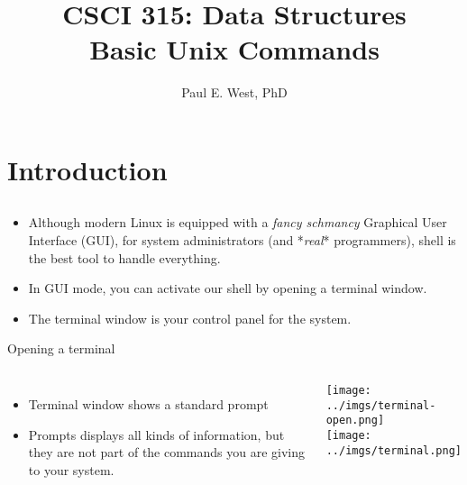 \documentclass{beamer}
\title{CSCI 315: Data Structures \\ 
    Basic Unix Commands
}
\author{Paul E. West, PhD}
\institute{
  Department of Computer Science\\
  Charleston Southern University
}
\begin{document}
\begin{frame}
  \titlepage
\end{frame}


\section{Introduction}
\subsection{}
\begin{frame}{}
\begin{itemize}
\item Although modern Linux is equipped with a \textit{fancy schmancy} Graphical User Interface (GUI), for system administrators (and *\textit{real}* programmers), shell is the best tool to handle everything.
\item In GUI mode, you can activate our shell by opening a terminal window.
\item The terminal window is your control panel for the system.
\end{itemize}
\end{frame}

\begin{frame}{Opening a terminal}
\begin{columns}[c]
\begin{itemize}
\item Terminal window shows a standard prompt
\item Prompts displays all kinds of information, but they are not part of the commands you are giving to your system.
\end{itemize}
\texttt{[image: ../imgs/terminal-open.png]} \\
\texttt{[image: ../imgs/terminal.png]}
\end{columns}
\end{frame}
\end{document}
